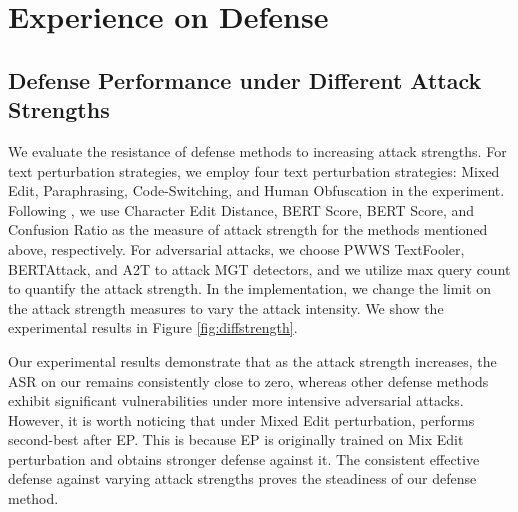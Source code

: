 \section{Experience on Defense}

\subsection{Defense Performance under Different Attack Strengths}

\begin{figure*}[htbp]
    \centering
    \caption{\textbf{Defense performance under attack with different strengths.} A lower ASR(\%) indicates better defensive performance. A larger character edit distance indicates greater attack intensity in the Mixed Edit Attack. A lower BERT score corresponds to stronger attacks in the Paraphrasing Attack and Code-Switching Attack. A higher obfuscation ratio reflects greater intensity in the Human Obfuscation Attack. Similarly, for PWWS, BERTAttack, TextFooler, and A2T, a larger maximum query count signifies a stronger attack.
    }
    \label{fig:diffstrength} 
\end{figure*}


We evaluate the resistance of defense methods to increasing attack strengths.
For text perturbation strategies, we employ four text perturbation strategies: Mixed Edit, Paraphrasing, Code-Switching, and Human Obfuscation in the experiment.
Following \citet{wang2024stumbling}, we use Character Edit Distance, BERT Score, BERT Score, and Confusion Ratio as the measure of attack strength for the methods mentioned above, respectively.
For adversarial attacks, we choose PWWS TextFooler, BERTAttack, and A2T to attack MGT detectors, and we utilize max query count to quantify the attack strength.
In the implementation, we change the limit on the attack strength measures to vary the attack intensity.
We show the experimental results in Figure \ref{fig:diffstrength}.

Our experimental results demonstrate that as the attack strength increases, the ASR on our  remains consistently close to zero, whereas other defense methods exhibit significant vulnerabilities under more intensive adversarial attacks.
However, it is worth noticing that under Mixed Edit perturbation,  performs second-best after EP.
This is because EP is originally trained on Mix Edit perturbation and obtains stronger defense against it.
The consistent effective defense against varying attack strengths proves the steadiness of our defense method.

